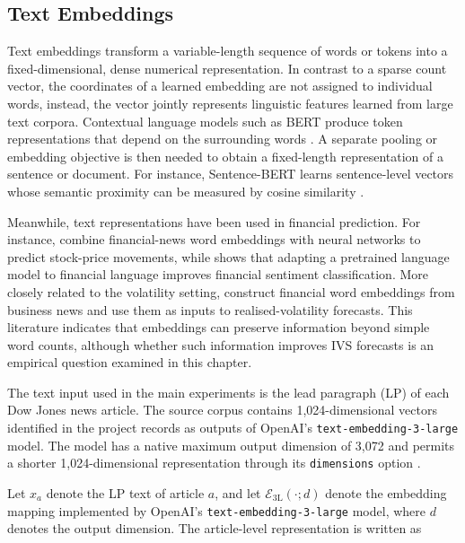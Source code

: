 \subsection*{Text Embeddings}

Text embeddings transform a variable-length sequence of words or tokens into a fixed-dimensional, dense numerical representation. In contrast to a sparse count vector, the coordinates of a learned embedding are not assigned to individual words, instead, the vector jointly represents linguistic features learned from large text corpora. Contextual language models such as BERT produce token representations that depend on the surrounding words \citep{devlin2019bert}.  A separate pooling or embedding objective is then needed to obtain a fixed-length representation of a sentence or document. For instance, Sentence-BERT learns sentence-level vectors whose semantic proximity can be measured by cosine similarity \citep{reimers2019sentencebert}.


Meanwhile, text representations have been used in financial prediction. For instance, \citet{peng2016leverage} combine financial-news word embeddings with neural networks to predict stock-price movements, while \citet{araci2019finbert} shows that adapting a pretrained language model to financial language improves financial sentiment classification.  More closely related to the volatility setting, \citet{rahimikia2021realised} construct financial word embeddings from business news and use them as inputs to realised-volatility forecasts. This literature indicates that embeddings can preserve information beyond simple word counts, although whether such information improves IVS forecasts is an empirical question examined in this chapter.


The text input used in the main experiments is the lead paragraph (LP) of each Dow Jones news article. The source corpus contains 1,024-dimensional vectors identified in the project records as outputs of OpenAI's \texttt{text-embedding-3-large} model. The model has a native maximum output dimension of 3,072 and permits a shorter 1,024-dimensional representation through its \texttt{dimensions} option \citep{openai2024newembeddingmodels}.


Let $x_a$ denote the LP text of article $a$, and let $\mathcal{E}_{\mathrm{3L}}(\cdot;d)$ denote the embedding mapping implemented by OpenAI’s \texttt{text-embedding-3-large} model, where \(d\) denotes the output dimension. The article-level representation is written as

